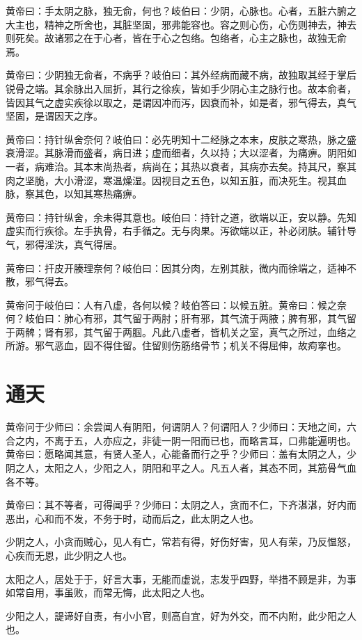 \documentclass[a4paper,12pt,UTF8,twoside]{ctexbook}
\begin{document}
	黄帝曰：手太阴之脉，独无俞，何也？岐伯曰：少阴，心脉也。心者，五脏六腑之大主也，精神之所舍也，其脏坚固，邪弗能容也。容之则心伤，心伤则神去，神去则死矣。故诸邪之在于心者，皆在于心之包络。包络者，心主之脉也，故独无俞焉。
	
	黄帝曰：少阴独无俞者，不病乎？岐伯曰：其外经病而藏不病，故独取其经于掌后锐骨之端。其余脉出入屈折，其行之徐疾，皆如手少阴心主之脉行也。故本俞者，皆因其气之虚实疾徐以取之，是谓因冲而泻，因衰而补，如是者，邪气得去，真气坚固，是谓因天之序。
	
	黄帝曰：持针纵舍奈何？岐伯曰：必先明知十二经脉之本末，皮肤之寒热，脉之盛衰滑涩。其脉滑而盛者，病日进；虚而细者，久以持；大以涩者，为痛痹。阴阳如一者，病难治。其本末尚热者，病尚在；其热以衰者，其病亦去矣。持其尺，察其肉之坚脆，大小滑涩，寒温燥湿。因视目之五色，以知五脏，而决死生。视其血脉，察其色，以知其寒热痛痹。
	
	黄帝曰：持针纵舍，余未得其意也。岐伯曰：持针之道，欲端以正，安以静。先知虚实而行疾徐。左手执骨，右手循之。无与肉果。泻欲端以正，补必闭肤。辅针导气，邪得淫泆，真气得居。
	
	黄帝曰：扞皮开腠理奈何？岐伯曰：因其分肉，左别其肤，微内而徐端之，适神不散，邪气得去。
	
	黄帝问于岐伯曰：人有八虚，各何以候？岐伯答曰：以候五脏。黄帝曰：候之奈何？岐伯曰：肺心有邪，其气留于两肘；肝有邪，其气流于两腋；脾有邪，其气留于两髀；肾有邪，其气留于两腘。凡此八虚者，皆机关之室，真气之所过，血络之所游。邪气恶血，固不得住留。住留则伤筋络骨节；机关不得屈伸，故痀挛也。
	
	\chapter{通天}
	
	黄帝问于少师曰：余尝闻人有阴阳，何谓阴人？何谓阳人？少师曰：天地之间，六合之内，不离于五，人亦应之，非徒一阴一阳而已也，而略言耳，口弗能遍明也。黄帝曰：愿略闻其意，有贤人圣人，心能备而行之乎？少师曰：盖有太阴之人，少阴之人，太阳之人，少阳之人，阴阳和平之人。凡五人者，其态不同，其筋骨气血各不等。
	
	黄帝曰：其不等者，可得闻乎？少师曰：太阴之人，贪而不仁，下齐湛湛，好内而恶出，心和而不发，不务于时，动而后之，此太阴之人也。
	
	少阴之人，小贪而贼心，见人有亡，常若有得，好伤好害，见人有荣，乃反愠怒，心疾而无恩，此少阴之人也。
	
	太阳之人，居处于于，好言大事，无能而虚说，志发乎四野，举措不顾是非，为事如常自用，事虽败，而常无悔，此太阳之人也。
	
	少阳之人，諟谛好自责，有小小官，则高自宜，好为外交，而不内附，此少阳之人也。
	
\end{document}
